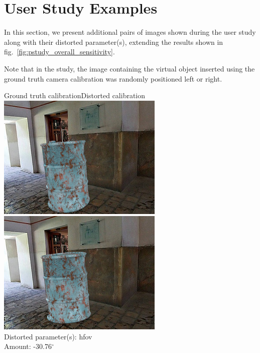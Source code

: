 \clearpage

\protect\hypertarget{study}{}{}

\hypertarget{user-study-examples}{%
\section{User Study Examples}\label{user-study-examples}}

In this section, we present additional pairs of images shown during the
user study along with their distorted parameter(s), extending the
results shown in fig.~\ref{fig:pstudy_overall_sensitivity}.

Note that in the study, the image containing the virtual object inserted using the
ground truth camera calibration was randomly positioned left or right.


\begin{minipage}{\linewidth}
\centering
\vspace{1em}
Ground truth calibration\hspace{0.2\linewidth}Distorted calibration\\\vspace{0.5em}
\includegraphics[width=0.45\linewidth]{study/thumb/pano_ahxngimugqzaln-1_4_gt.jpg}
\includegraphics[width=0.45\linewidth]{study/thumb/pano_ahxngimugqzaln-1_4_dc.jpg}\\
Distorted parameter(s): hfov\\
Amount: -30.76$^\circ$
\end{minipage}

